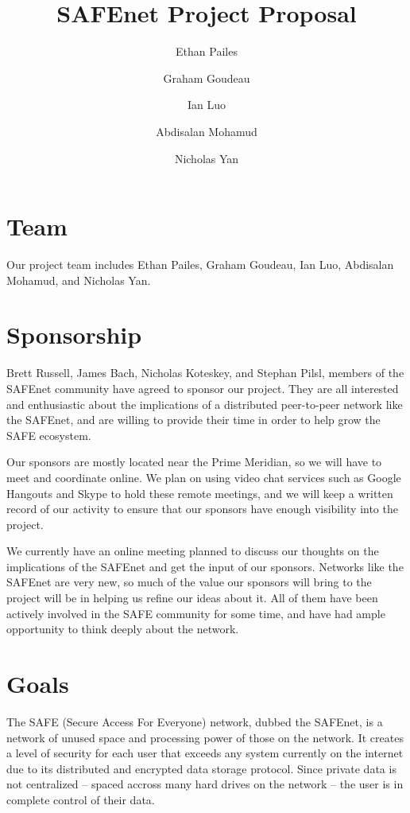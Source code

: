 \documentclass[twocolumn, 12pt]{article}
\title{SAFEnet Project Proposal}
\author{
  Ethan Pailes
  \and
  Graham Goudeau
  \and
  Ian Luo
  \and
  Abdisalan Mohamud
  \and
  Nicholas Yan
}
\date{}
\begin{document}
\maketitle

\section{Team}
Our project team includes Ethan Pailes, Graham Goudeau, Ian Luo,
Abdisalan Mohamud, and Nicholas Yan.

\section{Sponsorship}

Brett Russell, James Bach, Nicholas Koteskey, and Stephan Pilsl,
members of the SAFEnet community have agreed to sponsor our project.
They are all interested and enthusiastic about the implications of
a distributed peer-to-peer network like the SAFEnet, and are willing
to provide their time in order to help grow the SAFE ecosystem.

Our sponsors are mostly located near the Prime Meridian, so we will
have to meet and coordinate online. We plan on using video chat services
such as Google Hangouts and Skype to hold these remote meetings, and we
will keep a written record of our activity to ensure that our sponsors
have enough visibility into the project.

We currently have an online meeting planned to discuss our thoughts on
the implications of the SAFEnet and get the input of our sponsors. Networks
like the SAFEnet are very new, so much of the value our sponsors will bring
to the project will be in helping us refine our ideas about it. All of them
have been actively involved in the SAFE community for some time, and have
had ample opportunity to think deeply about the network.

\section{Goals}

The SAFE (Secure Access For Everyone) network, dubbed the SAFEnet,
is a network of unused space and processing power of those on the network.
It creates a level of security for each user that exceeds any system
currently on the internet due to its distributed and encrypted data
storage protocol. Since private data is not centralized -- spaced
accross many hard drives on the network -- the user is in complete
control of their data.
\end{document}
